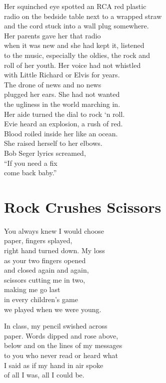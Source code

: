 \documentclass[twoside,10pt]{book}
\begin{document}
Her squinched eye spotted an RCA red plastic\\
radio on the bedside table next to a wrapped straw\\
and the cord stuck into a wall plug somewhere.\\
Her parents gave her that radio\\
when it was new and she had kept it, listened\\
to the music, especially the oldies, the rock and\\
roll of her youth. Her voice had not whistled\\
with Little Richard or Elvis for years.\\
The drone of news and no news\\
plugged her ears. She had not wanted\\
the ugliness in the world marching in.\\
Her aide turned the dial to rock `n roll.\\
Evie heard an explosion, a rush of red.\\
Blood roiled inside her like an ocean.\\
She raised herself to her elbows.\\
Bob Seger lyrics screamed,\\
``If you need a fix\\
come back baby.''


\clearpage
\section{Rock Crushes Scissors}

You always knew I would choose\\
paper, fingers splayed,\\
right hand turned down. My loss\\
as your two fingers opened\\
and closed again and again,\\
scissors cutting me in two,\\
making me go last\\
in every children's game\\
we played when we were young.

In class, my pencil swished across\\
paper. Words dipped and rose above,\\
below and on the lines of my messages\\
to you who never read or heard what\\
I said as if my hand in air spoke\\
of all I was, all I could be.
\end{document}

